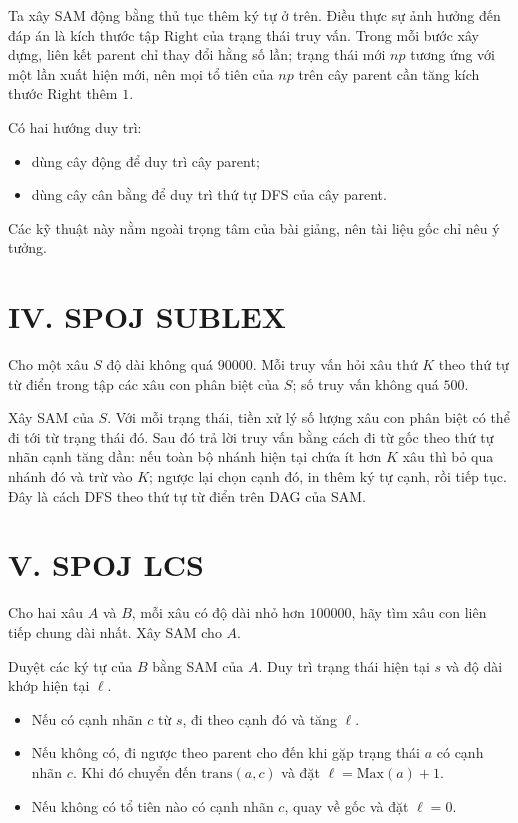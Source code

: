 \documentclass[11pt]{article}
\begin{document}
Ta xây SAM động bằng thủ tục thêm ký tự ở trên.  Điều thực sự ảnh hưởng đến đáp
án là kích thước tập $\mathrm{Right}$ của trạng thái truy vấn.  Trong mỗi bước
xây dựng, liên kết parent chỉ thay đổi hằng số lần; trạng thái mới $np$ tương
ứng với một lần xuất hiện mới, nên mọi tổ tiên của $np$ trên cây parent cần tăng
kích thước $\mathrm{Right}$ thêm $1$.

Có hai hướng duy trì:
\begin{itemize}
  \item dùng cây động để duy trì cây parent;
  \item dùng cây cân bằng để duy trì thứ tự DFS của cây parent.
\end{itemize}
Các kỹ thuật này nằm ngoài trọng tâm của bài giảng, nên tài liệu gốc chỉ nêu ý
tưởng.

\section{IV. SPOJ SUBLEX}

Cho một xâu $S$ độ dài không quá $90000$.  Mỗi truy vấn hỏi xâu thứ $K$ theo
thứ tự từ điển trong tập các xâu con phân biệt của $S$; số truy vấn không quá
$500$.

Xây SAM của $S$.  Với mỗi trạng thái, tiền xử lý số lượng xâu con phân biệt có
thể đi tới từ trạng thái đó.  Sau đó trả lời truy vấn bằng cách đi từ gốc theo
thứ tự nhãn cạnh tăng dần: nếu toàn bộ nhánh hiện tại chứa ít hơn $K$ xâu thì bỏ
qua nhánh đó và trừ vào $K$; ngược lại chọn cạnh đó, in thêm ký tự cạnh, rồi
tiếp tục.  Đây là cách DFS theo thứ tự từ điển trên DAG của SAM.

\section{V. SPOJ LCS}

Cho hai xâu $A$ và $B$, mỗi xâu có độ dài nhỏ hơn $100000$, hãy tìm xâu con
liên tiếp chung dài nhất.  Xây SAM cho $A$.

Duyệt các ký tự của $B$ bằng SAM của $A$.  Duy trì trạng thái hiện tại $s$ và
độ dài khớp hiện tại $\ell$.
\begin{itemize}
  \item Nếu có cạnh nhãn $c$ từ $s$, đi theo cạnh đó và tăng $\ell$.
  \item Nếu không có, đi ngược theo parent cho đến khi gặp trạng thái $a$ có
  cạnh nhãn $c$.  Khi đó chuyển đến $\mathrm{trans}(a,c)$ và đặt
  $\ell=\mathrm{Max}(a)+1$.
  \item Nếu không có tổ tiên nào có cạnh nhãn $c$, quay về gốc và đặt
  $\ell=0$.
\end{itemize}
\end{document}
